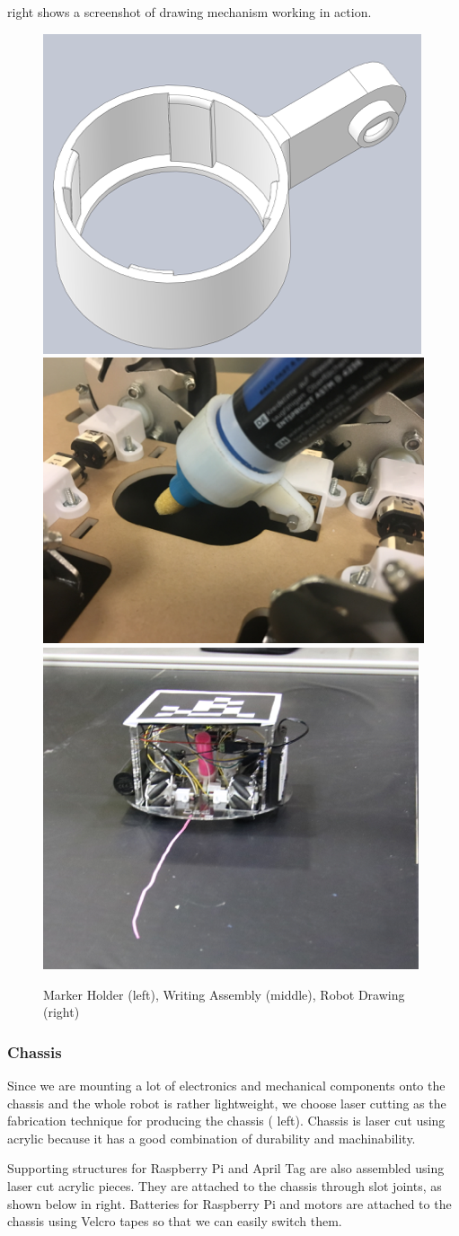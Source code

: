  right shows a screenshot of drawing mechanism working in action. 
\begin{figure}[h!]
\centering
\includegraphics[width=0.33\columnwidth]{figs/writing1.png}
\includegraphics[width=0.33\columnwidth]{figs/writing2.png}
\includegraphics[width=0.33\columnwidth]{figs/writing3.png}
\caption{Marker Holder (left), Writing Assembly (middle), Robot Drawing (right)}
\label{fig:so3}
\end{figure}

\subsubsection{Chassis}
\label{sec:me_chassis}
Since we are mounting a lot of electronics and mechanical components onto the chassis and the whole robot is rather lightweight, we choose laser cutting as the fabrication technique for producing the chassis ( left). Chassis is laser cut using acrylic because it has a good combination of durability and machinability. 

Supporting structures for Raspberry Pi and April Tag are also assembled using laser cut acrylic pieces. They are attached to the chassis through slot joints, as shown below in  right. Batteries for Raspberry Pi and motors are attached to the chassis using Velcro tapes so that we can easily switch them. 

